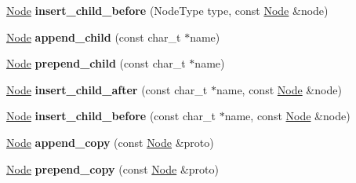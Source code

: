 \begin{DoxyCompactItemize}
\item 
\hypertarget{classphys_1_1xml_1_1Node_a36dd60f74bcf0ac054169c3c6ae8e286}{
\hyperlink{classphys_1_1xml_1_1Node}{Node} {\bfseries insert\_\-child\_\-before} (NodeType type, const \hyperlink{classphys_1_1xml_1_1Node}{Node} \&node)}
\label{d7/d0a/classphys_1_1xml_1_1Node_a36dd60f74bcf0ac054169c3c6ae8e286}

\item 
\hypertarget{classphys_1_1xml_1_1Node_aae3d925cc040d9fddfe173410bcdd322}{
\hyperlink{classphys_1_1xml_1_1Node}{Node} {\bfseries append\_\-child} (const char\_\-t $\ast$name)}
\label{d7/d0a/classphys_1_1xml_1_1Node_aae3d925cc040d9fddfe173410bcdd322}

\item 
\hypertarget{classphys_1_1xml_1_1Node_ab6e8a5ec035a2b66a3d0475498012f3d}{
\hyperlink{classphys_1_1xml_1_1Node}{Node} {\bfseries prepend\_\-child} (const char\_\-t $\ast$name)}
\label{d7/d0a/classphys_1_1xml_1_1Node_ab6e8a5ec035a2b66a3d0475498012f3d}

\item 
\hypertarget{classphys_1_1xml_1_1Node_a6b3345a4e9f56147c21c76a8aeb5d9df}{
\hyperlink{classphys_1_1xml_1_1Node}{Node} {\bfseries insert\_\-child\_\-after} (const char\_\-t $\ast$name, const \hyperlink{classphys_1_1xml_1_1Node}{Node} \&node)}
\label{d7/d0a/classphys_1_1xml_1_1Node_a6b3345a4e9f56147c21c76a8aeb5d9df}

\item 
\hypertarget{classphys_1_1xml_1_1Node_a9212a51ca71f8098b5425bb459eb366c}{
\hyperlink{classphys_1_1xml_1_1Node}{Node} {\bfseries insert\_\-child\_\-before} (const char\_\-t $\ast$name, const \hyperlink{classphys_1_1xml_1_1Node}{Node} \&node)}
\label{d7/d0a/classphys_1_1xml_1_1Node_a9212a51ca71f8098b5425bb459eb366c}

\item 
\hypertarget{classphys_1_1xml_1_1Node_a0bf9542120cadd27890fa60aa365a849}{
\hyperlink{classphys_1_1xml_1_1Node}{Node} {\bfseries append\_\-copy} (const \hyperlink{classphys_1_1xml_1_1Node}{Node} \&proto)}
\label{d7/d0a/classphys_1_1xml_1_1Node_a0bf9542120cadd27890fa60aa365a849}

\item 
\hypertarget{classphys_1_1xml_1_1Node_a96508d5e780085b962263c093dcb1e27}{
\hyperlink{classphys_1_1xml_1_1Node}{Node} {\bfseries prepend\_\-copy} (const \hyperlink{classphys_1_1xml_1_1Node}{Node} \&proto)}
\label{d7/d0a/classphys_1_1xml_1_1Node_a96508d5e780085b962263c093dcb1e27}


\end{DoxyCompactItemize}
